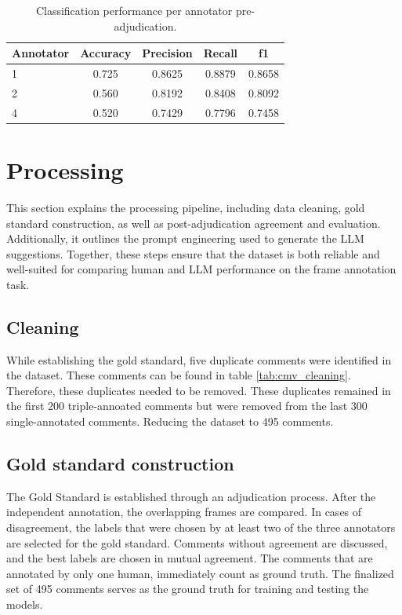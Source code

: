 \documentclass[
10pt, %
a4paper, %
oneside, %
headinclude,footinclude, %
] {book}%
\begin{document}
\begin{table}[htbp]
\centering
\begin{tabular}{lcccc}
\hline
\textbf{Annotator} & \textbf{Accuracy} & \textbf{Precision} & \textbf{Recall} & \textbf{f1} \\
\hline
1 & 0.725 & 0.8625 & 0.8879 & 0.8658 \\
2 & 0.560 & 0.8192 & 0.8408 & 0.8092 \\
4 & 0.520 & 0.7429 & 0.7796 & 0.7458 \\
\hline
\end{tabular}
\caption{Classification performance per annotator pre-adjudication.}
\label{tab:pre-adjudication_annotator_performance}
\end{table}




\section{Processing}
This section explains the processing pipeline, including
data cleaning, gold standard construction, as well as post-adjudication agreement and evaluation. Additionally, it outlines the prompt engineering used to generate the LLM suggestions. Together, these steps ensure that the dataset is both reliable and well-suited for comparing human and LLM performance on the frame annotation task.

\subsection{Cleaning}
While establishing the gold standard, five duplicate comments were identified in the dataset. These comments can be found in table \ref{tab:cmv_cleaning}. Therefore, these duplicates needed to be removed. These duplicates remained in the first 200 triple-annoated comments but were removed from the last 300 single-annotated comments. Reducing the dataset to 495 comments.

\subsection{Gold standard construction}
The Gold Standard is established through an adjudication process. After the independent annotation, the overlapping frames are compared. In cases of disagreement, the labels that were chosen by at least two of the three annotators are selected for the gold standard. Comments without agreement are discussed, and the best labels are chosen in mutual agreement. The comments that are annotated by only one human, immediately count as ground truth. The finalized set of 495 comments serves as the ground truth for training and testing the models.
\end{document}
